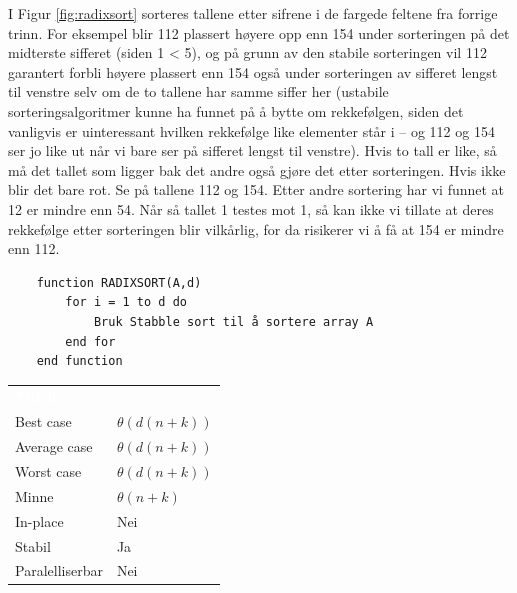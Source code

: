 \noindent I Figur \ref{fig:radixsort} sorteres tallene etter sifrene i de fargede feltene fra forrige trinn. For eksempel blir 112 plassert høyere opp enn 154 under sorteringen på det midterste sifferet (siden 1 < 5), og på grunn av den stabile sorteringen vil 112 garantert forbli høyere plassert enn 154 også under sorteringen av sifferet lengst til venstre selv om de to tallene har samme siffer her (ustabile sorteringsalgoritmer kunne ha funnet på å bytte om rekkefølgen, siden det vanligvis er uinteressant hvilken rekkefølge like elementer står i – og 112 og 154 ser jo like ut når vi bare ser på sifferet lengst til venstre). Hvis to tall er like, så må det tallet som ligger bak det andre også gjøre det etter sorteringen. Hvis ikke blir det bare rot. Se på tallene 112 og 154. Etter andre sortering har vi funnet at 12 er mindre enn 54. Når så tallet 1 testes mot 1, så kan ikke vi tillate at deres rekkefølge etter sorteringen blir vilkårlig, for da risikerer vi å få at 154 er mindre enn 112.

\begin{lstlisting}
    function RADIXSORT(A,d)
    	for i = 1 to d do
    		Bruk Stabble sort til å sortere array A
    	end for
    end function
\end{lstlisting}

\begin{table}[H]
    \label{tab:bubblesort}
    \centering
    \begin{tabular}{|L{15em} | L{15em}|}
        \hline
        \textbf{\textcolor{white}{Tilfelle}} & \textbf{\textcolor{white}{}}\\
        Best case & $\theta(d(n + k))$\\
        Average case & $\theta(d(n + k))$\\
        Worst case & $\theta(d(n + k))$\\
        Minne & $\theta(n + k)$\\
        In-place & Nei\\
        Stabil & Ja\\
        Paralelliserbar & Nei\\
         \hline
    \end{tabular}
\end{table}

